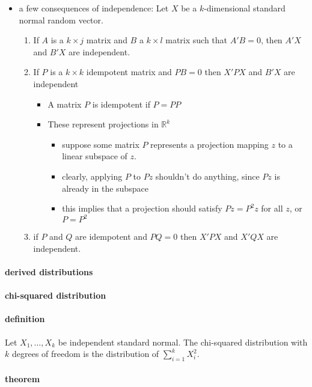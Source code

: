 \begin{itemize}
\item a few consequences of independence:
        Let $X$ be a $k$-dimensional standard normal random vector.
\begin{enumerate}
\item If $A$ is a $k \times j$ matrix and $B$ a $k \times l$ matrix
           such that $A'B = 0$, then $A'X$ and $B'X$ are independent.
\item If $P$ is a $k\times k$ idempotent matrix and $PB = 0$ then
           $X'PX$ and $B'X$ are independent
\begin{itemize}
\item A matrix $P$ is idempotent if $P = PP$
\item These represent projections in $\mathbb{R}^k$
\begin{itemize}
\item suppose some matrix $P$ represents a projection mapping $z$ to a linear subspace of $z$.
\item clearly, applying $P$ to $Pz$ shouldn't do anything, since $Pz$ is already in the subspace
\item this implies that a projection should satisfy $Pz = P^2 z$ for all $z$, or $P = P^2$
\end{itemize}
\end{itemize}
\item if $P$ and $Q$ are idempotent and $PQ = 0$ then $X'PX$ and
           $X'QX$ are independent.
\end{enumerate}
\end{itemize}
\paragraph{derived distributions}
\label{sec-3-2-2}
\paragraph{chi-squared distribution}
\label{sec-3-2-2-1}
\paragraph{definition}
\label{sec-3-2-2-1-1}

       Let $X_1,\dots,X_k$ be independent standard normal.  The
       chi-squared distribution with $k$ degrees of freedom is the
       distribution of $\sum_{i=1}^k X_i^2$.
\paragraph{theorem}
\label{sec-3-2-2-1-2}

